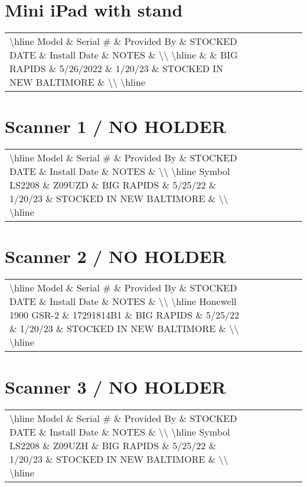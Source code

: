 \documentclass{article}%
\begin{document}
%
\section{Mini iPad with stand }%
\label{sec:MiniiPadwithstand}%
\begin{tabularx}{\textwidth}{|X|X|X|X|X|X|X|}%
\textbackslash{}hline%
Model \& Serial \# \& Provided By \& STOCKED DATE \& Install Date \& NOTES \&  \textbackslash{}\textbackslash{}%
\textbackslash{}hline%
 \&  \& BIG RAPIDS \& 5/26/2022 \& 1/20/23 \& STOCKED IN NEW BALTIMORE \&  \textbackslash{}\textbackslash{}%
\textbackslash{}hline%
\end{tabularx}

%
\section{Scanner 1 / NO HOLDER}%
\label{sec:Scanner1/NOHOLDER}%
\begin{tabularx}{\textwidth}{|X|X|X|X|X|X|X|}%
\textbackslash{}hline%
Model \& Serial \# \& Provided By \& STOCKED DATE \& Install Date \& NOTES \&  \textbackslash{}\textbackslash{}%
\textbackslash{}hline%
Symbol LS2208 \& Z09UZD \& BIG RAPIDS \& 5/25/22 \& 1/20/23 \& STOCKED IN NEW BALTIMORE \&  \textbackslash{}\textbackslash{}%
\textbackslash{}hline%
\end{tabularx}

%
\section{Scanner 2 / NO HOLDER}%
\label{sec:Scanner2/NOHOLDER}%
\begin{tabularx}{\textwidth}{|X|X|X|X|X|X|X|}%
\textbackslash{}hline%
Model \& Serial \# \& Provided By \& STOCKED DATE \& Install Date \& NOTES \&  \textbackslash{}\textbackslash{}%
\textbackslash{}hline%
Honewell 1900 GSR{-}2 \& 17291814B1 \& BIG RAPIDS \& 5/25/22 \& 1/20/23 \& STOCKED IN NEW BALTIMORE \&  \textbackslash{}\textbackslash{}%
\textbackslash{}hline%
\end{tabularx}

%
\section{Scanner 3 / NO HOLDER}%
\label{sec:Scanner3/NOHOLDER}%
\begin{tabularx}{\textwidth}{|X|X|X|X|X|X|X|}%
\textbackslash{}hline%
Model \& Serial \# \& Provided By \& STOCKED DATE \& Install Date \& NOTES \&  \textbackslash{}\textbackslash{}%
\textbackslash{}hline%
Symbol LS2208 \& Z09UZH \& BIG RAPIDS \& 5/25/22 \& 1/20/23 \& STOCKED IN NEW BALTIMORE \&  \textbackslash{}\textbackslash{}%
\textbackslash{}hline%
\end{tabularx}
\end{document}
